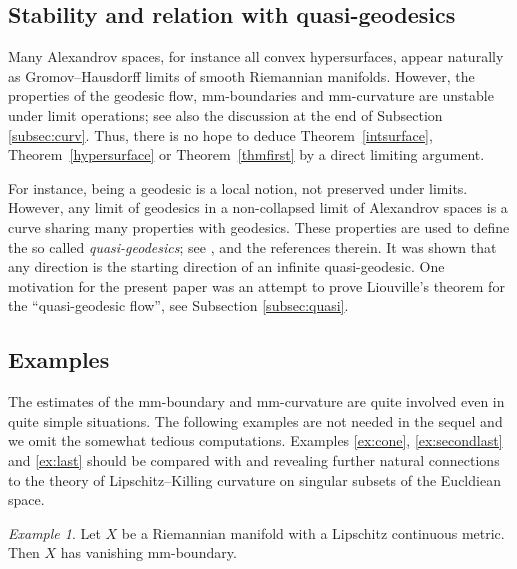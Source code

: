 \documentclass[12pt,leqno,intlimits]{amsart}
\numberwithin{equation}{section}
\theoremstyle{definition}
\theoremstyle{remark}
\newtheorem{ex}[thm]{Example}
\newcommand{\tref}[1]{Theorem~\ref{#1}}
\begin{document}
\subsection{Stability and relation with quasi-geodesics}
Many Alexandrov spaces, for instance all convex hypersurfaces, appear naturally as Gromov--Hausdorff limits of smooth Riemannian manifolds. However, the properties of the geodesic flow, mm-boundaries and mm-curvature are unstable under limit operations; see also the discussion at the end of Subsection \ref{subsec:curv}.
Thus, there is no hope to deduce \tref{intsurface}, \tref{hypersurface} or \tref{thmfirst} by a direct limiting argument.

For instance, being a geodesic is a local notion, not preserved under limits.
However, any limit of geodesics in a non-collapsed limit of Alexandrov spaces is a curve sharing many properties with geodesics.
These properties are used to define the so called \emph{quasi-geodesics};
see \cite{PP}, \cite{Petsemi} and the references therein.
It was shown that any direction is the starting direction of an infinite quasi-geodesic.
One motivation for the present paper was an attempt to prove Liouville's theorem for the ``quasi-geodesic flow'', see Subsection \ref{subsec:quasi}.

\subsection{Examples} \label{subsec:example}
The estimates of the mm-boundary and mm-curvature are quite involved even in quite simple situations.
The following examples are not needed in the sequel and we omit the somewhat tedious computations. Examples \ref{ex:cone}, \ref{ex:secondlast} and \ref{ex:last} should be compared with
\cite{Bernig-CAT} and \cite{Bernig-Alex} revealing further natural connections to the theory of Lipschitz--Killing curvature on singular subsets of the Eucldiean space.


\begin{ex}
Let $X$ be a Riemannian manifold with a Lipschitz continuous metric.
Then $X$ has vanishing  mm-boundary.
\end{ex}
\end{document}
